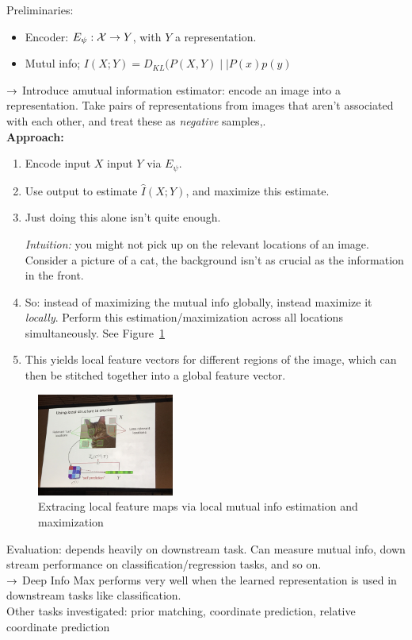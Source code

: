 Preliminaries:
\begin{itemize}
    \item Encoder: $E_\psi : \mathcal{X} \rightarrow Y$, with $Y$ a representation.
    
    \item Mutul info; $I(X;Y) = D_{KL}(P(X,Y) \mid \mid P(x) p(y)$
\end{itemize}

$\rightarrow$ Introduce amutual information estimator: encode an image into a representation. Take pairs of representations from images that aren't associated with each other, and treat these as {\it negative} samples,. \\

{\bf Approach:} 
\begin{enumerate}
    \item Encode input $X$ input $Y$ via $E_\psi$.
    \item Use output to estimate $\hat{I}(X;Y)$, and maximize this estimate.
    \item Just doing this alone isn't quite enough.
    
    {\it Intuition:} you might not pick up on the relevant locations of an image. Consider a picture of a cat, the background isn't as crucial as the information in the front.
    
    \item So: instead of maximizing the mutual info globally, instead maximize it {\it locally}. Perform this estimation/maximization across all locations simultaneously. See Figure~\ref{fig:cat}
    \item This yields local feature vectors for different regions of the image, which can then be stitched together into a global feature vector.
\end{enumerate}

\begin{figure}
    \centering
    \includegraphics[width=0.4\textwidth]{images/cat.JPG}
    \caption{Extracing local feature maps via local mutual info estimation and maximization}
    \label{fig:cat}
\end{figure}

Evaluation: depends heavily on downstream task. Can measure mutual info, down stream performance on classification/regression tasks, and so on. \\

$\rightarrow$ Deep Info Max performs very well when the learned representation is used in downstream tasks like classification. \\

Other tasks investigated: prior matching, coordinate prediction, relative coordinate prediction \\

